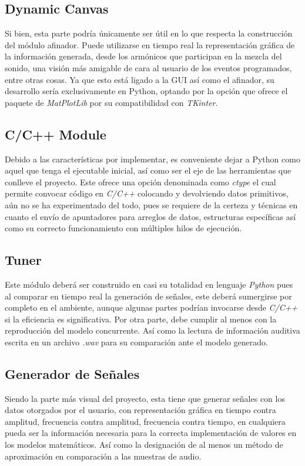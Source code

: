 \documentclass{book}
\begin{document}
	\subsection*{Dynamic Canvas}
	Si bien, esta parte podría únicamente ser útil en lo que respecta la construcción del módulo afinador. Puede utilizarse en tiempo real la representación gráfica de la información generada, desde los armónicos que participan en la mezcla del sonido, una visión más amigable de cara al usuario de los eventos programados, entre otras cosas. Ya que esto está ligado a la GUI así como el afinador, su desarrollo sería exclusivamente en Python, optando por la opción que ofrece el paquete de \emph{MatPlotLib} por su compatibilidad con \emph{TKinter}.
	\subsection*{C/C++ Module}
	Debido a las características por implementar, es conveniente dejar a Python como aquel que tenga el ejecutable inicial, así como ser el eje de las herramientas que conlleve el proyecto. Este ofrece una opción denominada como \emph{ctype} el cual permite convocar código en \emph{C/C++} colocando y devolviendo datos primitivos, aún no se ha experimentado del todo, pues se requiere de la certeza y técnicas en cuanto el envío de apuntadores para arreglos de datos, estructuras específicas así como su correcto funcionamiento con múltiples hilos de ejecución.
	\subsection*{Tuner}
	Este módulo deberá ser construido en casi su totalidad en lenguaje \emph{Python} pues al comparar en tiempo real la generación de señales, este deberá sumergirse por completo en el ambiente, aunque algunas partes podrían invocarse desde \emph{C/C++} si la eficiencia es significativa. Por otra parte, debe cumplir al menos con la reproducción del modelo concurrente. Así como la lectura de información auditiva escrita en un archivo \emph{.wav} para su comparación ante el modelo generado. 
	\subsection*{Generador de Señales}
	Siendo la parte más visual del proyecto, esta tiene que generar señales con los datos otorgados por el usuario, con representación gráfica en tiempo contra amplitud, frecuencia contra amplitud, frecuencia contra tiempo, en cualquiera pueda ser la información necesaria para la correcta implementación de valores en los modelos matemáticos. Así como la designación de al menos un método de aproximación en comparación a las muestras de audio.
\end{document}
